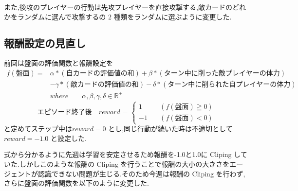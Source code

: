 \documentclass{jarticle}     %
\begin{document}
また,後攻のプレイヤーの行動は先攻プレイヤーを直接攻撃する,敵カードのどれかをランダムに選んで攻撃するの 2 種類をランダムに選ぶように変更した.

\subsection{報酬設定の見直し}
前回は盤面の評価関数と報酬設定を
\begin{equation*}
  \begin{split}
    f(\mathrm{盤面}) = 
    &\alpha*\mathrm{(自カードの評価値の和)}+\beta*\mathrm{(ターン中に削った敵プレイヤーの体力)}\\
   & - \gamma*\mathrm{(敵カードの評価値の和)} - \delta*\mathrm{(ターン中に削られた自プレイヤーの体力)}\\
    &where \qquad \alpha , \beta , \gamma , \delta \in \mathbb{R}^+
  \end{split}
\end{equation*}
\begin{equation*}
  \mathrm{エピソード終了後}
  \quad reward \text{ = }
  \left\{
    \begin{aligned}
        1 \quad &(f(\mathrm{盤面}) \geqq 0) \\
        -1 \quad &(f(\mathrm{盤面}) < 0)
    \end{aligned}
    \right.
\end{equation*}
と定めてステップ中は$reward = 0$ とし,同じ行動が続いた時は不適切として $reward = -1.0$ と設定した.

式から分かるように先週は学習を安定させるため報酬を-1.0と1.0に Cliping していた.しかしこのような報酬の Cliping を行うことで報酬の大小の大きさをエージェントが認識できない問題が生じる.そのため今週は報酬の Cliping を行わず,さらに盤面の評価関数を以下のように変更した.
\end{document}
